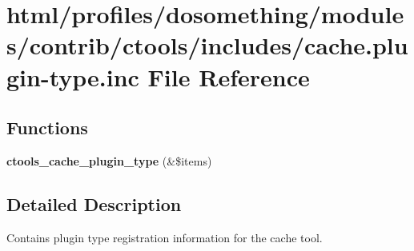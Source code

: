 \hypertarget{cache_8plugin-type_8inc}{
\section{html/profiles/dosomething/modules/contrib/ctools/includes/cache.plugin-\/type.inc File Reference}
\label{cache_8plugin-type_8inc}
}
\subsection*{Functions}
\begin{DoxyCompactItemize}
\item 
\hypertarget{cache_8plugin-type_8inc_af3784a1028fad8a952d3463435d1e879}{
{\bfseries ctools\_\-cache\_\-plugin\_\-type} (\&\$items)}
\label{cache_8plugin-type_8inc_af3784a1028fad8a952d3463435d1e879}

\end{DoxyCompactItemize}


\subsection{Detailed Description}
Contains plugin type registration information for the cache tool. 
